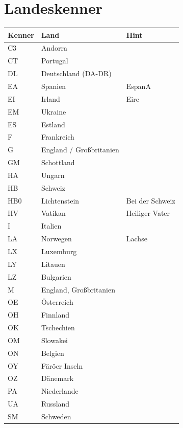 \documentclass[11pt,BCOR=8.5mm]{scrartcl}
\begin{document}
\section{Landeskenner}\label{sec:landeskenner}
  \begin{longtable}{| l | l | l |}
  \hline
  Kenner & Land & Hint \\
  \hline
  \hline
  \endhead
  C3 & Andorra & \\
  \hline
  CT & Portugal & \\
  \hline
  DL & Deutschland (DA-DR) & \\
  \hline
  EA & Spanien & EspanA\\
  \hline
  EI & Irland & Eire \\
  \hline
  EM & Ukraine & \\
  \hline
  ES & Estland & \\
  \hline
  F & Frankreich & \\
  \hline
  G & England / Großbritanien & \\
  \hline
  GM & Schottland & \\
  \hline
  HA & Ungarn & \\
  \hline
  HB & Schweiz & \\
  \hline
  HB0 & Lichtenstein & Bei der Schweiz \\
  \hline
  HV & Vatikan & Heiliger Vater \\
  \hline
  I & Italien & \\
  \hline
  LA & Norwegen & Lachse \\
  \hline
  LX & Luxemburg & \\
  \hline
  LY & Litauen & \\
  \hline
  LZ & Bulgarien & \\
  \hline
  M & England, Großbritanien & \\
  \hline
  OE & Österreich & \\
  \hline
  OH & Finnland & \\
  \hline
  OK & Tschechien & \\
  \hline
  OM & Slowakei & \\
  \hline
  ON & Belgien & \\
  \hline
  OY & Färöer Inseln & \\
  \hline
  OZ & Dänemark & \\
  \hline
  PA & Niederlande & \\
  \hline
  UA & Russland & \\
  \hline
  SM & Schweden & \\

\end{longtable}
\end{document}

